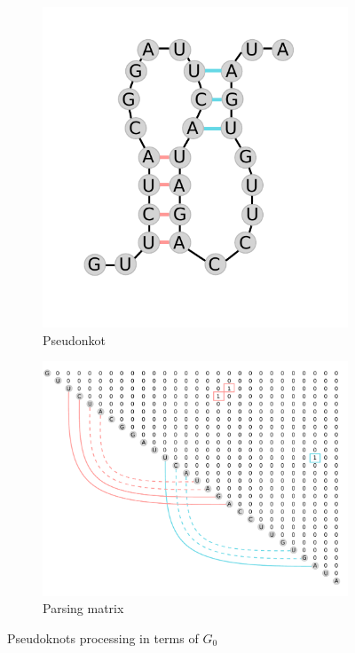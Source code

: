 \begin{figure}[h]
\centering
\begin{subfigure}{.3\textwidth}
  \centering
  \hbox{\includegraphics[width=.9\linewidth]{pics/pk.pdf}}
  \caption{Pseudonkot}
  \label{pk_a}
\end{subfigure}%
\begin{subfigure}{.7\textwidth}
  \centering
  \hbox{\includegraphics[width=.9\linewidth]{pics/matrix_pk.pdf}}
  \caption{Parsing matrix}
  \label{pk_b}
\end{subfigure}
\caption{Pseudoknots processing in terms of $G_0$}
\label{pk}
\end{figure}

